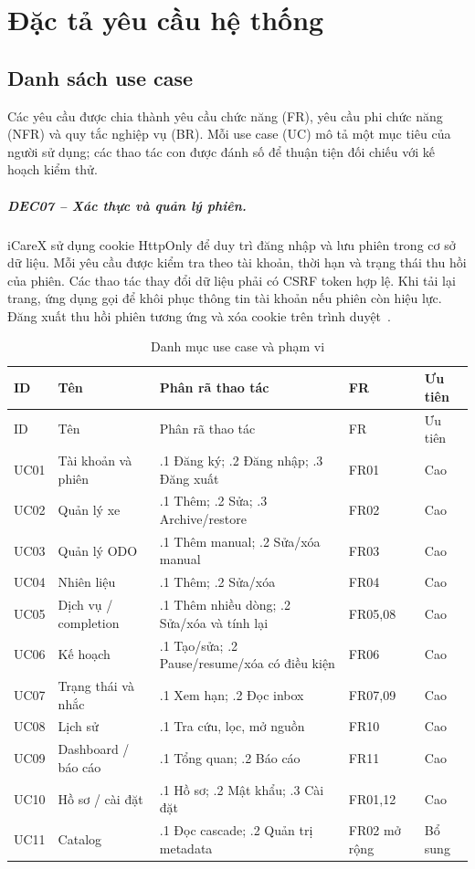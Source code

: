 \chapter{Đặc tả yêu cầu hệ thống}\label{chap:requirements}
\section{Danh sách use case}
Các yêu cầu được chia thành yêu cầu chức năng (FR), yêu cầu phi chức năng (NFR) và quy tắc nghiệp vụ (BR). Mỗi use case (UC) mô tả một mục tiêu của người sử dụng; các thao tác con được đánh số để thuận tiện đối chiếu với kế hoạch kiểm thử.

\paragraph{DEC07 -- Xác thực và quản lý phiên.}
iCareX sử dụng cookie HttpOnly để duy trì đăng nhập và lưu phiên trong cơ sở dữ liệu. Mỗi yêu cầu được kiểm tra theo tài khoản, thời hạn và trạng thái thu hồi của phiên. Các thao tác thay đổi dữ liệu phải có CSRF token hợp lệ. Khi tải lại trang, ứng dụng gọi  để khôi phục thông tin tài khoản nếu phiên còn hiệu lực. Đăng xuất thu hồi phiên tương ứng và xóa cookie trên trình duyệt~\cite{csrf}.

\begin{smalltable}\begin{longtable}{L{1.3cm}L{3.5cm}L{5.7cm}L{1.8cm}L{2cm}}
\caption{Danh mục use case và phạm vi}\label{tab:uc-list}\\
\toprule ID & Tên & Phân rã thao tác & FR & Ưu tiên\\\midrule\endfirsthead
\toprule ID & Tên & Phân rã thao tác & FR & Ưu tiên\\\midrule\endhead
UC01 & Tài khoản và phiên & .1 Đăng ký; .2 Đăng nhập; .3 Đăng xuất & FR01 & Cao\\
UC02 & Quản lý xe & .1 Thêm; .2 Sửa; .3 Archive/restore & FR02 & Cao\\
UC03 & Quản lý ODO & .1 Thêm manual; .2 Sửa/xóa manual & FR03 & Cao\\
UC04 & Nhiên liệu & .1 Thêm; .2 Sửa/xóa & FR04 & Cao\\
UC05 & Dịch vụ / completion & .1 Thêm nhiều dòng; .2 Sửa/xóa và tính lại & FR05,08 & Cao\\
UC06 & Kế hoạch & .1 Tạo/sửa; .2 Pause/resume/xóa có điều kiện & FR06 & Cao\\
UC07 & Trạng thái và nhắc & .1 Xem hạn; .2 Đọc inbox & FR07,09 & Cao\\
UC08 & Lịch sử & .1 Tra cứu, lọc, mở nguồn & FR10 & Cao\\
UC09 & Dashboard / báo cáo & .1 Tổng quan; .2 Báo cáo & FR11 & Cao\\
UC10 & Hồ sơ / cài đặt & .1 Hồ sơ; .2 Mật khẩu; .3 Cài đặt & FR01,12 & Cao\\
UC11 & Catalog & .1 Đọc cascade; .2 Quản trị metadata & FR02 mở rộng & Bổ sung\\\bottomrule
\end{longtable}\end{smalltable}

